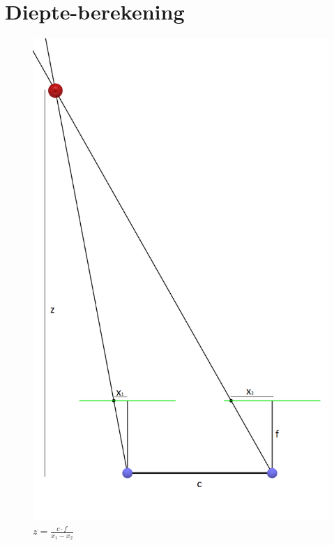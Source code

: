 \documentclass{peno-opdracht1}
\begin{document}
\section{Diepte-berekening} \label{App:Afstand}

\begin{figure}[h!]
	\begin{center}
		
		\includegraphics[scale=0.35]{Afstanden.png}
		\caption*{\(z = \frac{c \cdot f}{x_1 - x_2}\)}
	\end{center}
\end{figure}
\end{document}
